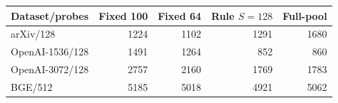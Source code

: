 \begin{tabular}{@{}lrrrr@{}}
\toprule
Dataset/probes & Fixed 100 & Fixed 64 & Rule $S=128$ & Full-pool \\
\midrule
arXiv/128 & 1224 & 1102 & 1291 & 1680 \\
OpenAI-1536/128 & 1491 & 1264 & 852 & 860 \\
OpenAI-3072/128 & 2757 & 2160 & 1769 & 1783 \\
BGE/512 & 5185 & 5018 & 4921 & 5062 \\
\bottomrule
\end{tabular}
